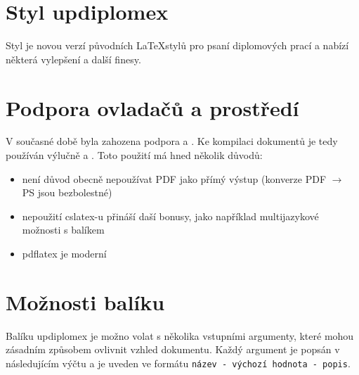\documentclass[a4paper,12pt]{article}
\begin{document}
\upmaketitle

\upthanksanot

\uptocandlists

\section{Styl updiplomex}
Styl  je novou verzí původních \LaTeX stylů pro psaní diplomových prací a nabízí některá vylepšení a další finesy.

\section{Podpora ovladačů a prostředí}
V současné době byla zahozena podpora  a . Ke kompilaci dokumentů je tedy používán výlučně  a . Toto použití má hned několik důvodů:
\begin{itemize}
\item není důvod obecně nepoužívat PDF jako přímý výstup (konverze PDF $\rightarrow$ PS jsou bezbolestné)
\item nepoužití cslatex-u přináší daší bonusy, jako například multijazykové možnosti s balíkem 
\item pdflatex je moderní
\end{itemize}

\section{Možnosti balíku}
Balíku updiplomex je možno volat s několika vstupními argumenty, které mohou zásadním způsobem ovlivnit vzhled dokumentu. Každý argument je popsán v následujícím výčtu a je uveden ve formátu \verb|název - výchozí hodnota - popis|.
\end{document}
